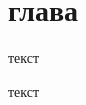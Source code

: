 \documentclass[a4paper,article,14pt]{extarticle}
\begin{document}


\tableofcontents
\pagebreak






\section{глава}

текст

текст \cite{test}




\end{document}
